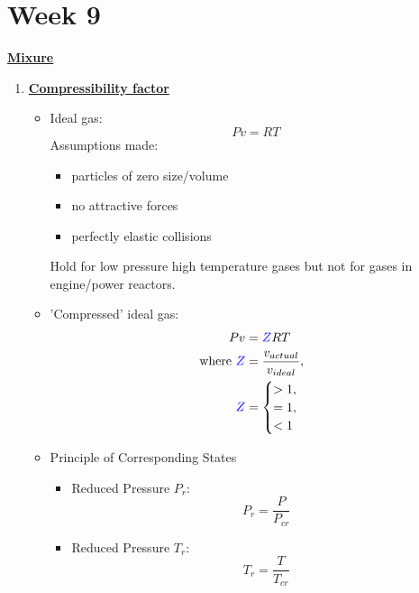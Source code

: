 \section{Week 9}
\Large \textbf{{\color{red}\underline{Mixure}}}

\begin{enumerate}
    \item \textbf{\ul{Compressibility factor}}
    \begin{itemize}
        \item Ideal gas: 
        \begin{equation*}
            Pv = RT
        \end{equation*}
        Assumptions made:
        \begin{itemize}
            \item particles of zero size/volume
            \item no attractive forces
            \item perfectly elastic collisions
        \end{itemize}
        Hold for {\color{green}low pressure high temperature gases} but not for {\color{red}gases in engine/power reactors}.
        \item 'Compressed' ideal gas:
        \begin{align*}
            Pv &= {\color{blue}Z}RT\\
            \text{where } {\color{blue}Z} &= \frac{v_{actual}}{v_{ideal}}, \\
            {\color{blue}Z} &= \begin{cases} 
            >1, \\
            =1, \\
            < 1
            \end{cases}
        \end{align*}
        \item {{\color{blue}Principle of Corresponding States}}
        \begin{itemize}
            \item {\color{blue}Reduced Pressure $P_r$}:
            \begin{equation*}
                P_r = \frac{P}{P_{cr}}
            \end{equation*}
            \item {\color{blue}Reduced Pressure $T_r$}:
            \begin{equation*}
                T_r = \frac{T}{T_{cr}}
            \end{equation*}

\end{itemize}
\end{itemize}
\end{enumerate}
